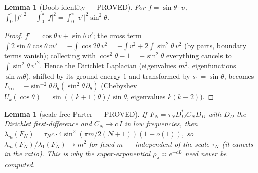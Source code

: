 \documentclass[11pt]{amsart}
\newtheorem{lemma}[theorem]{Lemma}
\theoremstyle{definition}
\theoremstyle{remark}
\begin{document}
\begin{lemma}[Doob identity --- PROVED]\label{lem:23A}
For $f=\sin\theta\cdot v$, $\int_0^\pi|f'|^2-\int_0^\pi|f|^2=\int_0^\pi|v'|^2\sin^2\theta$.
\end{lemma}
\begin{proof}
$f'=\cos\theta\,v+\sin\theta\,v'$; the cross term
$\int2\sin\theta\cos\theta\,vv'=-\int\cos2\theta\,v^2=-\int v^2+2\int\sin^2\theta\,v^2$ (by
parts, boundary terms vanish); collecting with $\cos^2\theta-1=-\sin^2\theta$ everything
cancels to $\int\sin^2\theta\,v'^2$. Hence the Dirichlet Laplacian (eigenvalues $m^2$,
eigenfunctions $\sin m\theta$), shifted by its ground energy $1$ and transformed by
$s_1=\sin\theta$, becomes $L_\infty=-\sin^{-2}\theta\,\partial_\theta(\sin^2\theta\,\partial_\theta)$
(Chebyshev $U_k(\cos\theta)=\sin((k+1)\theta)/\sin\theta$, eigenvalues $k(k+2)$).
\end{proof}
\begin{lemma}[scale-free Parter --- PROVED]\label{lem:23B}
If $F_N=\tau_N D_D^*C_N D_D$ with $D_D$ the Dirichlet first-difference and $C_N\to c\,I$ in
low frequencies, then $\lambda_m(F_N)=\tau_N c\cdot4\sin^2(\pi m/2(N+1))(1+o(1))$, so
$\lambda_m(F_N)/\lambda_1(F_N)\to m^2$ for fixed $m$ --- independent of the scale $\tau_N$
(it cancels in the ratio). This is why the super-exponential $\rho_\lambda\asymp e^{-cL}$
need never be computed.
\end{lemma}
\end{document}
